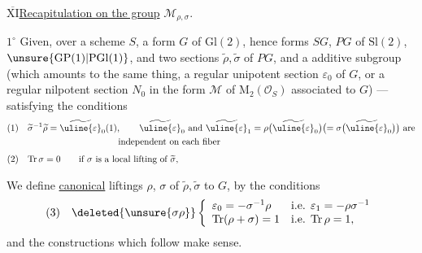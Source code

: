 



\uline{$\overline{\mathrm{XI}}$}\quad\uline{Recapitulation on the group} $\mathcal{M}_{\rho,\sigma}$.


\textcircled{$1^\circ$} Given, over a scheme $S$, a form $G$ of $\mathrm{Gl}(2)$, hence forms $SG$, $PG$ of $\mathrm{Sl}(2)$, $\unsure{\mathrm{GP}(1)|\mathrm{PGl}(1)}$, and two sections $\widetilde\rho,\widetilde\sigma$ of $PG$, and a   additive  subgroup
(which amounts to the same thing, a  regular unipotent section  $\varepsilon_0$ of $G$, or a regular nilpotent section $N_0$ in the form $\mathcal M$ of $\mathrm{M}_2(\mathcal O_S)$ associated to $G$) --- satisfying the conditions
\[
\begin{aligned}
(1)\quad &\widetilde\sigma^{-1}\widetilde\rho
  =\widetilde{\uline{\varepsilon}}_0(1),\qquad
  \widetilde{\uline{\varepsilon}}_0\text{ and }
  \widetilde{\uline{\varepsilon}}_1
  =\rho\bigl(\widetilde{\uline{\varepsilon}}_0\bigr)
  \bigl(=\sigma\bigl(\widetilde{\uline{\varepsilon}}_0\bigr)\bigr)
  \text{ are}\\
 &\hspace{10em}\text{independent on each fiber}\\[4pt]
(2)\quad &\mathrm{Tr}\,\sigma=0\qquad
 \text{if }\sigma\text{ is a local lifting of }\widetilde\sigma,
\end{aligned}
\]

We define \uline{canonical} liftings $\rho$, $\sigma$ of $\widetilde\rho,\widetilde\sigma$ to $G$,  by the conditions
\[
(3)\quad\deleted{\unsure{\sigma\rho}}
\left\{\begin{array}{ll}
 \varepsilon_0=-\sigma^{-1}\rho
 &\text{i.e. }\varepsilon_1=-\rho\sigma^{-1}\\
 \mathrm{Tr}(\rho+\sigma)=1
 &\text{i.e. }\mathrm{Tr}\,\rho=1,
\end{array}\right.
\]
and the constructions which follow make sense.


